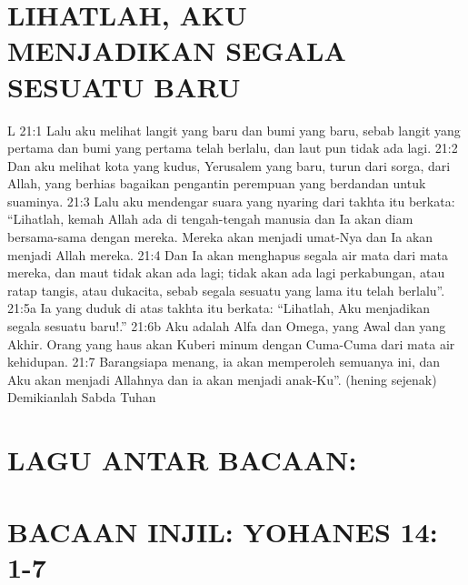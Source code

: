 \section*{LIHATLAH, AKU MENJADIKAN SEGALA SESUATU BARU}

L 21:1 Lalu aku melihat langit yang baru dan bumi yang baru,
sebab langit yang pertama dan bumi yang pertama telah berlalu, dan
laut pun tidak ada lagi. 21:2 Dan aku melihat kota yang kudus,
Yerusalem yang baru, turun dari sorga, dari Allah, yang berhias
bagaikan pengantin perempuan yang berdandan untuk suaminya.
21:3 Lalu aku mendengar suara yang nyaring dari takhta itu berkata:
“Lihatlah, kemah Allah ada di tengah-tengah manusia dan Ia akan
diam bersama-sama dengan mereka. Mereka akan menjadi umat-Nya
dan Ia akan menjadi Allah mereka. 21:4 Dan Ia akan menghapus
segala air mata dari mata mereka, dan maut tidak akan ada lagi; tidak
akan ada lagi perkabungan, atau ratap tangis, atau dukacita, sebab
segala sesuatu yang lama itu telah berlalu”. 21:5a Ia yang duduk di
atas takhta itu berkata: “Lihatlah, Aku menjadikan segala sesuatu
baru!.” 21:6b Aku adalah Alfa dan Omega, yang Awal dan yang
Akhir. Orang yang haus akan Kuberi minum dengan Cuma-Cuma
dari mata air kehidupan. 21:7 Barangsiapa menang, ia akan
memperoleh semuanya ini, dan Aku akan menjadi Allahnya dan ia
akan menjadi anak-Ku”. (hening sejenak)
Demikianlah Sabda Tuhan
\subsection*{}
\section*{LAGU ANTAR BACAAN:}

\section*{BACAAN INJIL: YOHANES 14: 1-7}




